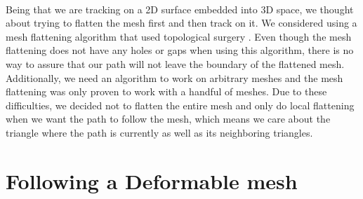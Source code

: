 \documentclass[11pt,psfig]{article}
\begin{document}
\\
Being that we are tracking on a 2D surface embedded into 3D space, we thought about trying to flatten the mesh first and then track on it. We considered using a mesh flattening algorithm that used topological surgery \cite{meshunfolding}. Even though the mesh flattening does not have any holes or gaps when using this algorithm, there is no way to assure that our path will not leave the boundary of the flattened mesh. Additionally, we need an algorithm to work on arbitrary meshes and the mesh flattening was only proven to work with a handful of meshes. Due to these difficulties, we decided not to flatten the entire mesh and only do local flattening when we want the path to follow the mesh, which means we care about the triangle where the path is currently as well as its neighboring triangles. 

\section*{Following a Deformable mesh}
\end{document}
